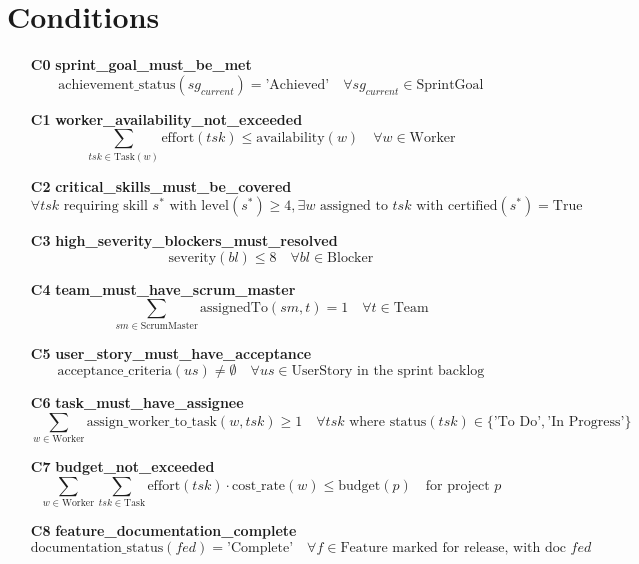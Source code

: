 \documentclass[11pt]{article}
\begin{document}
\section{Conditions}
\begin{itemize}
    \item[\textbf{C0}] \textbf{sprint\_goal\_must\_be\_met}
    \[ \text{achievement\_status}(sg_{current}) = \text{'Achieved'} \quad \forall sg_{current} \in \text{SprintGoal} \]
    
    \item[\textbf{C1}] \textbf{worker\_availability\_not\_exceeded}
    \[ \sum_{tsk \in \text{Task}(w)} \text{effort}(tsk) \leq \text{availability}(w) \quad \forall w \in \text{Worker} \]
    
    \item[\textbf{C2}] \textbf{critical\_skills\_must\_be\_covered}
    \[ \forall tsk \text{ requiring skill } s^* \text{ with } \text{level}(s^*) \geq 4, \exists w \text{ assigned to } tsk \text{ with } \text{certified}(s^*) = \text{True} \]
    
    \item[\textbf{C3}] \textbf{high\_severity\_blockers\_must\_resolved}
    \[ \text{severity}(bl) \leq 8 \quad \forall bl \in \text{Blocker} \]
    
    \item[\textbf{C4}] \textbf{team\_must\_have\_scrum\_master}
    \[ \sum_{sm \in \text{ScrumMaster}} \text{assignedTo}(sm, t) = 1 \quad \forall t \in \text{Team} \]
    
    \item[\textbf{C5}] \textbf{user\_story\_must\_have\_acceptance}
    \[ \text{acceptance\_criteria}(us) \neq \emptyset \quad \forall us \in \text{UserStory} \text{ in the sprint backlog} \]
    
    \item[\textbf{C6}] \textbf{task\_must\_have\_assignee}
    \[ \sum_{w \in \text{Worker}} \text{assign\_worker\_to\_task}(w, tsk) \geq 1 \quad \forall tsk \text{ where } \text{status}(tsk) \in \{\text{'To Do'}, \text{'In Progress'}\} \]
    
    \item[\textbf{C7}] \textbf{budget\_not\_exceeded}
    \[ \sum_{w \in \text{Worker}} \sum_{tsk \in \text{Task}} \text{effort}(tsk) \cdot \text{cost\_rate}(w) \leq \text{budget}(p) \quad \text{for project } p \]
    
    \item[\textbf{C8}] \textbf{feature\_documentation\_complete}
    \[ \text{documentation\_status}(fed) = \text{'Complete'} \quad \forall f \in \text{Feature} \text{ marked for release, with doc } fed \]
\end{itemize}
\end{document}
